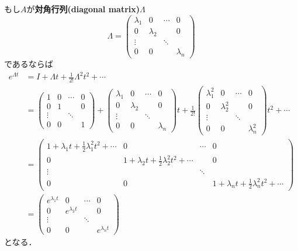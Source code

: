 もし$A$が{\bf {対角行列}(diagonal matrix)}$\Lambda$
\begin{equation}
 \Lambda =
  \left(\begin{array}{cccc}
         \lambda_1 & 0         & \cdots & 0 \\
	 0         & \lambda_2 &        & 0 \\
	 \vdots    &           & \ddots & \\
	 0         & 0         &        & \lambda_n 
	\end{array}\right)
\end{equation}
であるならば
\begin{align}
 e^{\Lambda t}
 &= I + \Lambda t + \frac{1}{2!}\Lambda^2t^2 + \cdots \nonumber\\
 &= 
 \left(\begin{array}{cccc}
        1      & 0 & \cdots & 0 \\
	0      & 1 &        & 0 \\
	\vdots &   & \ddots &   \\
	0      & 0 &        & 1
       \end{array}\right) +
 \left(\begin{array}{cccc}
        \lambda_1 & 0         & \cdots & 0 \\
	0         & \lambda_2 &        & 0 \\
	\vdots    &           & \ddots &   \\
	0         & 0         &        & \lambda_n
       \end{array}\right) t +
 \frac{1}{2!}
 \left(\begin{array}{cccc}
        \lambda_1^2 & 0         & \cdots & 0 \\
	0         & \lambda_2^2 &        & 0 \\
	\vdots    &           & \ddots &   \\
	0         & 0         &        & \lambda_n^2
       \end{array}\right) t^2 + \cdots \nonumber\\
 &= 
 \left(\begin{array}{cccc}
        1 + \lambda_1 t + \frac{1}{2} \lambda_1^2 t^2 + \cdots & 0 & \cdots & 0 \\
	0      & 1 + \lambda_2 t + \frac{1}{2} \lambda_2^2 t^2 + \cdots &        & 0 \\
	\vdots &   & \ddots &   \\
	0      & 0 &        & 1 + \lambda_n t + \frac{1}{2} \lambda_n^2 t^2 + \cdots
       \end{array}\right) 
\nonumber\\
 &=
 \left(\begin{array}{cccc}
        e^{\lambda_1 t} & 0               & \cdots & 0 \\
	0               & e^{\lambda_2 t} &        & 0 \\
	\vdots          &                 & \ddots & \\
	0               & 0               &        & e^{\lambda_n t}
       \end{array}\right)
 \label{e_diag}
\end{align}
となる．

